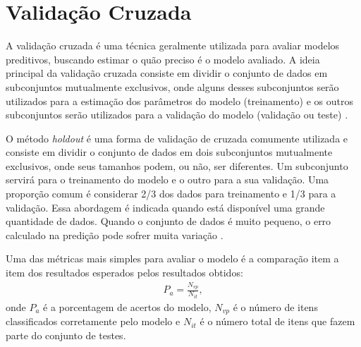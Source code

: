 \section{Validação Cruzada}

A validação cruzada é uma técnica geralmente utilizada para avaliar modelos preditivos, buscando estimar o quão preciso é o modelo avaliado. A ideia principal da validação cruzada consiste em dividir o conjunto de dados em subconjuntos mutualmente exclusivos, onde alguns desses subconjuntos serão utilizados para a estimação dos parâmetros do modelo (treinamento) e os outros subconjuntos serão utilizados para a validação do modelo (validação ou teste) \cite{kohavi1995}.

O método \textit{holdout} é uma forma de validação de cruzada comumente utilizada e consiste em dividir o conjunto de dados em dois subconjuntos mutualmente exclusivos, onde seus tamanhos podem, ou não, ser diferentes. Um subconjunto servirá para o treinamento do modelo e o outro para a sua validação. Uma proporção comum é considerar 2/3 dos dados para treinamento e 1/3 para a validação. Essa abordagem é indicada quando está disponível uma grande quantidade de dados. Quando o conjunto de dados é muito pequeno, o erro calculado na predição pode sofrer muita variação \cite{kohavi1995}.

Uma das métricas mais simples para avaliar o modelo é a comparação item a item dos resultados esperados pelos resultados obtidos:
%
\begin{align}
P_{a}=\frac{N_{vp}}{N_{it}},
\end{align}
%
onde \(P_{a}\) é a porcentagem de acertos do modelo, \(N_{vp}\) é o número de itens classificados corretamente pelo modelo e \(N_{it}\) é o número total de itens que fazem parte do conjunto de testes.
